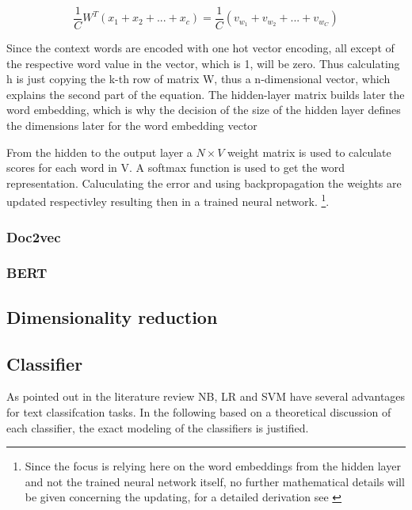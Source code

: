 \documentclass[12pt, a4paper, titlepage]{article}
\begin{document}
\[ \frac{1}{C} W^T(x_1 + x_2 + ... +x_c) = \frac{1}{C}(v_{w_1} + v_{w_2} + ... + v_{w_C}) \]

Since the context words are encoded with one hot vector encoding, all except of the respective word value in the vector, which is 1, will be zero. Thus calculating h is just copying the k-th row of matrix W, thus a n-dimensional vector, which explains the second part of the equation. The hidden-layer matrix builds later the word embedding, which is why the decision of the size of the hidden layer defines the dimensions later for the word embedding vector \citep{rong2014}

From the hidden to the output layer a $N \times V$
weight matrix is used to calculate scores for each word in V. A softmax function is used to get the word representation. Caluculating the error and using backpropagation the weights are updated respectivley resulting then in a trained neural network. \footnote{Since the focus is relying here on the word embeddings from the hidden layer and not the trained neural network itself, no further mathematical details will be given concerning the updating, for a detailed derivation see \citep{rong2014}}. \citep{rong2014}




\subsubsection{Doc2vec}

\subsubsection{BERT}

\subsection{Dimensionality reduction}

\subsection{Classifier}
As pointed out in the literature review \ac{NB}, \ac{LR} and \ac{SVM} have several advantages for text classifcation tasks. In the following based on a theoretical discussion of each classifier, the exact modeling of the classifiers is justified. 
\end{document}
